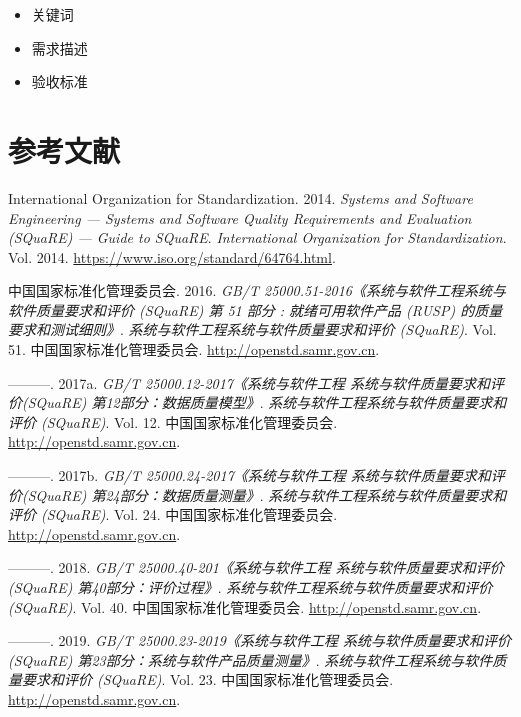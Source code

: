 \documentclass[hyperref, a4paper]{ctexart}
\providecommand{\tightlist}{%
  \setlength{\itemsep}{0pt}\setlength{\parskip}{0pt}}
\begin{document}
\begin{itemize}
\tightlist
\item
  关键词
\item
  需求描述
\item
  验收标准
\end{itemize}

\pagebreak

\hypertarget{ux53c2ux8003ux6587ux732e}{%
\section*{参考文献}\label{ux53c2ux8003ux6587ux732e}}

\hypertarget{refs}{}
\leavevmode\hypertarget{ref-innovativeInternationalisation}{}%
International Organization for Standardization. 2014. \emph{Systems and
Software Engineering --- Systems and Software Quality Requirements and
Evaluation (SQuaRE) --- Guide to SQuaRE}. \emph{International
Organization for Standardization}. Vol. 2014.
\url{https://www.iso.org/standard/64764.html}.

\leavevmode\hypertarget{ref-innovative1}{}%
中国国家标准化管理委员会. 2016. \emph{GB/T
25000.51-2016《系统与软件工程系统与软件质量要求和评价 (SQuaRE) 第 51
部分 : 就绪可用软件产品 (RUSP) 的质量要求和测试细则》}.
\emph{系统与软件工程系统与软件质量要求和评价 (SQuaRE)}. Vol. 51.
中国国家标准化管理委员会. \url{http://openstd.samr.gov.cn}.

\leavevmode\hypertarget{ref-innovative3}{}%
---------. 2017a. \emph{GB/T 25000.12-2017《系统与软件工程
系统与软件质量要求和评价(SQuaRE) 第12部分：数据质量模型》}.
\emph{系统与软件工程系统与软件质量要求和评价 (SQuaRE)}. Vol. 12.
中国国家标准化管理委员会. \url{http://openstd.samr.gov.cn}.

\leavevmode\hypertarget{ref-innovative4}{}%
---------. 2017b. \emph{GB/T 25000.24-2017《系统与软件工程
系统与软件质量要求和评价(SQuaRE) 第24部分：数据质量测量》}.
\emph{系统与软件工程系统与软件质量要求和评价 (SQuaRE)}. Vol. 24.
中国国家标准化管理委员会. \url{http://openstd.samr.gov.cn}.

\leavevmode\hypertarget{ref-innovative5}{}%
---------. 2018. \emph{GB/T 25000.40-201《系统与软件工程
系统与软件质量要求和评价(SQuaRE) 第40部分：评价过程》}.
\emph{系统与软件工程系统与软件质量要求和评价 (SQuaRE)}. Vol. 40.
中国国家标准化管理委员会. \url{http://openstd.samr.gov.cn}.

\leavevmode\hypertarget{ref-innovative2}{}%
---------. 2019. \emph{GB/T 25000.23-2019《系统与软件工程
系统与软件质量要求和评价(SQuaRE) 第23部分：系统与软件产品质量测量》}.
\emph{系统与软件工程系统与软件质量要求和评价 (SQuaRE)}. Vol. 23.
中国国家标准化管理委员会. \url{http://openstd.samr.gov.cn}.
\end{document}
